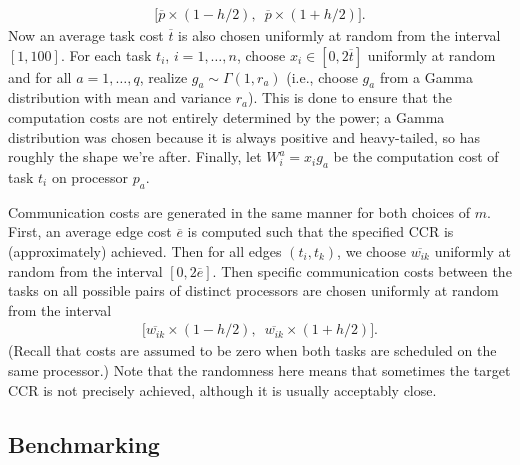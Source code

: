 \documentclass[12pt]{article}
\begin{document}
\begin{align*}
\big[ \overline{p} \times (1 - h/2), \enspace \overline{p} \times (1 + h/2)     \big].
\end{align*}  
Now an average task cost $\overline{t}$ is also chosen uniformly at random from the interval $[1, 100]$. For each task $t_i$, $i = 1, \dots, n$, choose $x_i \in [0, 2\overline{t}]$ uniformly at random and for all $a = 1, \dots, q$, realize $g_a \sim \Gamma(1, r_a)$ (i.e., choose $g_a$ from a Gamma distribution with mean and variance $r_a$). This is done to ensure that the computation costs are not entirely determined by the power; a Gamma distribution was chosen because it is always positive and heavy-tailed, so has roughly the shape we're after.  Finally, let $W_i^a = x_i g_a$ be the computation cost of task $t_i$ on processor $p_a$. 

Communication costs are generated in the same manner for both choices of $m$. First, an average edge cost $\overline{e}$ is computed such that the specified CCR is (approximately) achieved. Then for all edges $(t_i, t_k)$, we choose $\overline{w_{ik}}$ uniformly at random from the interval $[0, 2\overline{e}]$. Then specific communication costs between the tasks on all possible pairs of distinct processors are chosen uniformly at random from the interval    
\begin{align*}
\big[ \overline{w_{ik}} \times (1 - h/2), \enspace \overline{w_{ik}} \times (1 + h/2)   \big].
\end{align*} 
(Recall that costs are assumed to be zero when both tasks are scheduled on the same processor.) Note that the randomness here means that sometimes the target CCR is not precisely achieved, although it is usually acceptably close.



\subsection{Benchmarking}
\label{subsect.benchmarking}
\end{document}
